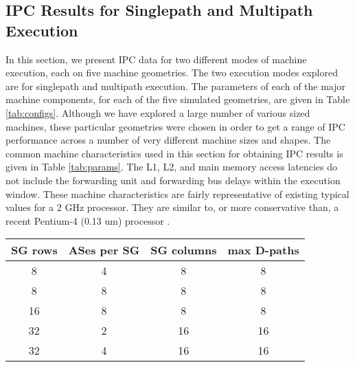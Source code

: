 \documentclass[10pt,twocolumn,dvips]{article}
\begin{document}
\subsection{IPC Results for Singlepath and Multipath Execution}
%
In this section, we present IPC data for two different 
modes of machine execution, each on five machine geometries.
The two execution modes explored are for singlepath and multipath
execution.
The parameters of each of the major machine components, for each of the 
five
simulated geometries, are given in Table \ref{tab:configs}.
Although we have explored a large number of various sized
machines, these particular geometries were chosen in order
to get a range of IPC performance across a number of very
different machine sizes and shapes.
The common machine characteristics used in this section for
obtaining IPC results is given in Table \ref{tab:params}.
The L1, L2, and main memory access latencies do not include
the forwarding unit and forwarding bus delays within the
execution window.
These machine characteristics are fairly representative of
existing typical values for a 2 GHz processor.  
They are similar to, or more conservative
than, a recent Pentium-4 (0.13 um) processor \cite{Lud02}.
%
\begin{table*}
\scriptsize{
\begin{center}
\caption{Machine geometries simulated for each of the benchmark
programs.}
\label{tab:configs}
\begin{tabular}{|c|c|c|c|}
\hline 
SG rows&
ASes per SG&
SG columns&
max D-paths\\
\hline
\hline 
8&4&8&8\\
\hline 
8&8&8&8\\
\hline 
16&8&8&8\\
\hline 
32&2&16&16\\
\hline 
32&4&16&16\\
\hline
\end{tabular}
\end{center}
}
\end{table*}
%
\end{document}
